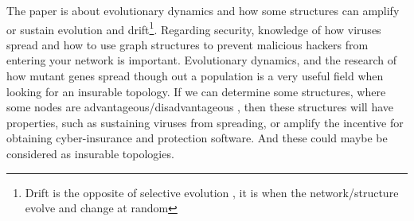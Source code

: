  The paper \cite{lieberman2005evolutionary} is about evolutionary dynamics and how some structures
can amplify or sustain evolution and drift\footnote{Drift is the opposite of selective evolution
, it is when the network/structure evolve and change at random}.  Regarding security, knowledge of how viruses spread and how to use graph structures to prevent malicious hackers from entering your network is important. Evolutionary dynamics, and the research of how mutant genes spread though out a population is a very useful field when looking for an insurable topology. 
If we can determine some structures, where some nodes are advantageous/disadvantageous , then these structures will have properties, such as sustaining viruses from spreading, or amplify the incentive for obtaining cyber-insurance and
protection software. And these could maybe be considered as insurable topologies.

